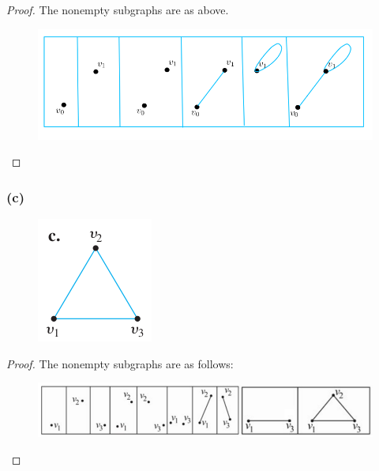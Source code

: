 \documentclass[14pt]{extarticle}
\begin{document}
\begin{proof}
The nonempty subgraphs are as above.

\begin{figure}[ht!]
\centering
\includegraphics[scale=0.3]{../images/10.1.23.b.2.png}
\end{figure}
\end{proof}

\subsubsection{(c)}
\begin{figure}[ht!]
\centering
\includegraphics[scale=0.5]{../images/10.1.23.c.1.png}
\end{figure}

\begin{proof}
The nonempty subgraphs are as follows:

\begin{figure}[ht!]
\centering
\includegraphics[scale=0.5]{../images/10.1.23.c.2.png}
\end{figure}
\end{proof}
\end{document}
